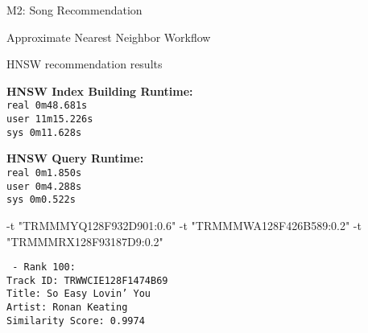 \documentclass{beamer}
\begin{document}
\begin{section}{M2: Song Recommendation}
\begin{frame}{Approximate Nearest Neighbor Workflow}
    \end{frame}

    \begin{frame}[fragile]{HNSW recommendation results}
    \begin{minipage}[b]{0.5\linewidth}
        \textbf{HNSW Index Building Runtime:} \\
        \centering
        \texttt{real    0m48.681s} \\
        \texttt{user    11m15.226s} \\
        \texttt{sys     0m11.628s}
    \end{minipage}%
    \begin{minipage}[b]{0.5\linewidth}
        \textbf{HNSW Query Runtime:} \\
        \centering
        \texttt{real    0m1.850s} \\
        \texttt{user    0m4.288s} \\
        \texttt{sys     0m0.522s}
    \end{minipage}
    \vspace{0.2cm}

    \begin{minipage}[b]{0.5\linewidth}
        \vspace{1.0cm}
        \begin{bashcode}
-t "TRMMMYQ128F932D901:0.6"
-t "TRMMMWA128F426B589:0.2"
-t "TRMMMRX128F93187D9:0.2"
        \end{bashcode}
    \end{minipage}%
    \begin{minipage}[b]{0.5\linewidth}
        \centering
        \texttt{
    - Rank 100: \\
    Track ID: TRWWCIE128F1474B69\\
    Title: So Easy Lovin' You \\
    Artist: Ronan Keating \\
    Similarity Score: 0.9974}
    \end{minipage}
    \end{frame}


\end{section}
\end{document}
